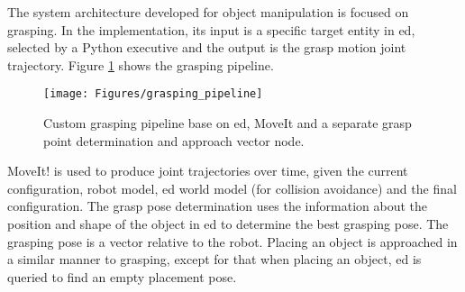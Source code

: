 The system architecture developed for object manipulation is focused on grasping. In the implementation, its input is a specific target entity in \acrshort{ed}, selected by a Python executive and the output is the grasp motion joint trajectory.
Figure \ref{fig:grasping_pipeline} shows the grasping pipeline.
\begin{figure}[H]
    \centering
	\texttt{[image: Figures/grasping\_pipeline]}
	\caption{Custom grasping pipeline base on \acrshort{ed}, MoveIt and a separate grasp point determination and approach vector node.}
	\label{fig:grasping_pipeline}
\end{figure}
\noindent MoveIt! is used to produce joint trajectories over time, given the current configuration, robot model, \acrshort{ed} world model (for collision avoidance) and the final configuration.
The grasp pose determination uses the information about the position and shape of the object in \acrshort{ed} to determine the best grasping pose.
The grasping pose is a vector relative to the robot.
Placing an object is approached in a similar manner to grasping, except for that when placing an object, \acrshort{ed} is queried to find an empty placement pose.

%
